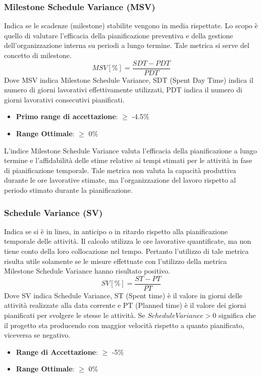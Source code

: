 \documentclass[12pt,a4paper]{article}
\begin{document}
\subsubsection{Milestone Schedule Variance (MSV)}
Indica se le scadenze (milestone) stabilite vengono in media rispettate. Lo scopo è quello di valutare l'efficacia della pianificazione preventiva e della gestione dell'organizzazione interna su periodi a lungo termine. Tale metrica si serve del concetto di milestone.
\[MSV [\%] = \frac{SDT - PDT}{PDT}\]
Dove MSV indica Milestone Schedule Variance, SDT (Spent Day Time) indica il numero di giorni lavorativi effettivamente utilizzati, PDT indica il numero di giorni lavorativi consecutivi pianificati.
\begin{itemize}
	\item \textbf{Primo range di accettazione}: $\geq$ -4.5\%
	\item \textbf{Range Ottimale}: $\geq$ 0\%
\end{itemize}
L'indice Milestone Schedule Variance valuta l'efficacia della pianificazione a lungo termine e l'affidabilità delle stime relative ai tempi stimati per le attività in fase di pianificazione temporale.
Tale metrica non valuta la capacità produttiva durante le ore lavorative stimate, ma l'organizzazione del lavoro rispetto al periodo stimato durante la pianificazione.

\subsubsection{Schedule Variance (SV)} \label{schedule_variance}
Indica se si è in linea, in anticipo o in ritardo rispetto alla pianificazione temporale delle attività. Il calcolo utilizza le ore lavorative quantificate, ma non tiene conto della loro collocazione nel tempo. Pertanto l'utilizzo di tale metrica risulta utile solamente se le misure effettuate con l'utilizzo della metrica Milestone Schedule Variance hanno risultato positivo.
\[SV [\%] = \frac{ST - PT}{PT}\]
Dove SV indica Schedule Variance, ST (Spent time) è il valore in giorni delle attività realizzate alla data corrente e PT (Planned time) è il valore dei giorni pianificati per svolgere le stesse le attività.
Se $ScheduleVariance > 0$ significa che il progetto sta producendo con maggior velocità rispetto a quanto pianificato, viceversa se negativo.
\begin{itemize}
\item \textbf{Range di Accettazione}: $\geq$ -5\%
\item \textbf{Range Ottimale}: $\geq$ 0\%
\end{itemize}
\end{document}
